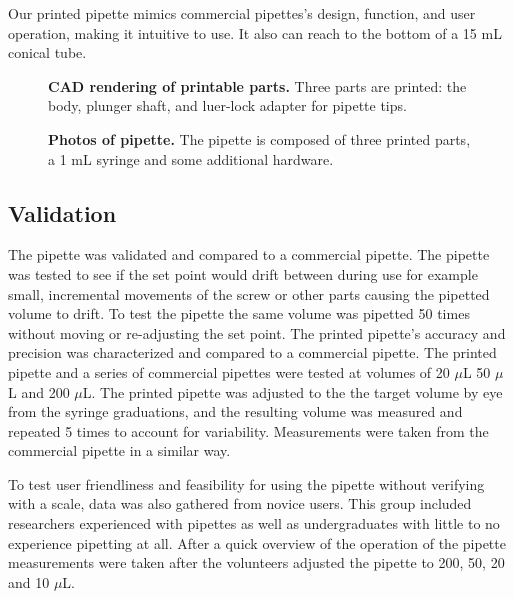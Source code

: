 \documentclass[10pt,letterpaper]{article}
\begin{document}
Our printed pipette mimics commercial pipettes's design, function, and user operation, making it intuitive to use.
It also can reach to the bottom of a 15 mL conical tube.



\begin{figure}
\caption{
{\bf CAD rendering of printable parts.}  Three parts are printed: the body, plunger shaft, and luer-lock adapter for pipette tips.
}
\label{fig1}
\end{figure}

\begin{figure}
\caption{
{\bf Photos of pipette.}  The pipette is composed of three printed parts, a 1 mL syringe and some additional hardware.  
}
\label{fig2}
\end{figure}

\subsection*{Validation}
The pipette was validated and compared to a commercial pipette. 
The pipette was tested to see if the set point would drift between during use for example small, incremental movements of the screw or other parts causing the pipetted volume to drift. 
To test the pipette the same volume was pipetted 50 times without moving or re-adjusting the set point. 
The printed pipette’s accuracy and precision was characterized and compared to a commercial pipette. 
The printed pipette and a series of commercial pipettes were tested at volumes of 20 $\mu$L 50 $\mu$L and 200 $\mu$L. 
The printed pipette was adjusted to the the target volume by eye from the syringe graduations, and the resulting volume was measured and repeated 5 times to account for variability.
Measurements were taken from the commercial pipette in a similar way.

To test user friendliness and feasibility for using the pipette without verifying with a scale, data was also gathered from novice users. 
This group included researchers experienced with pipettes as well as undergraduates with little to no experience pipetting at all.
After a quick overview of the operation of the pipette measurements were taken after the volunteers adjusted the pipette to 200, 50, 20 and 10 $\mu$L. 
\end{document}
